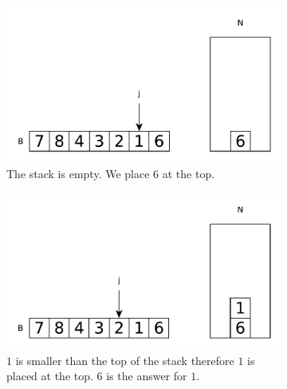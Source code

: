  \begin{figure}
	\vspace*{-0.5in}
	\centering
	\begin{subfigure}[t]{0.49\textwidth}
		\begin{framed}
			\includegraphics[width=1\linewidth]{sources/next_greater_element/images/stack1}
		\end{framed}
		\caption{The stack is empty. We place $6$ at the top.}
		\label{fig:next_greater:variation1:stack1}
	 \end{subfigure}
	\hfill
	\begin{subfigure}[t]{0.49\textwidth}
		\begin{framed}
			\includegraphics[width=1\linewidth]{sources/next_greater_element/images/stack2}
		\end{framed}
		\caption{$1$ is smaller than the top of the stack therefore $1$ is placed at the top. $6$ is the answer for $1$.}
		\label{fig:next_greater:variation1:stack2}
	 \end{subfigure}
	 \hfill
	 \begin{subfigure}[t]{0.49\textwidth}
		\begin{framed}

\end{framed}
\end{subfigure}
\end{figure}
